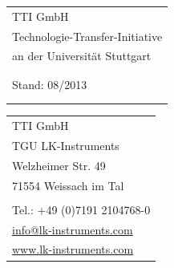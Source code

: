 \documentclass[a4paper, final, 11pt, oneside]{scrartcl}
\begin{document}
\thispagestyle{fancy}

  \begin{minipage}[l]{0.6\textwidth}
    \hspace*{-3.5mm}
    \footnotesize
    \begin{tabular}[t]{l@{}}
      TTI GmbH\\
      Technologie-Transfer-Initiative\\
      an der Universität Stuttgart\\
      \\
      \\
      Stand: 08/2013\\
      \\
      \\
    \end{tabular}
    \footnotesize    
  \end{minipage}
  \hfill
  \begin{minipage}[c]{0.3\textwidth}
    \begin{flushright}
      \footnotesize
      \begin{tabular}[t]{l@{}}
      TTI GmbH\\
      TGU LK-Instruments\\
      Welzheimer Str. 49\\
      71554 Weissach im Tal\\
      \\
      Tel.: +49 (0)7191 2104768-0\\
      \href{mailto:info@lk-instruments.com}{info@lk-instruments.com}\\
      \href{http://www.lk-instruments.com}{www.lk-instruments.com}\\
    \end{tabular}
    \end{flushright}
  \end{minipage}
  
\end{document}
